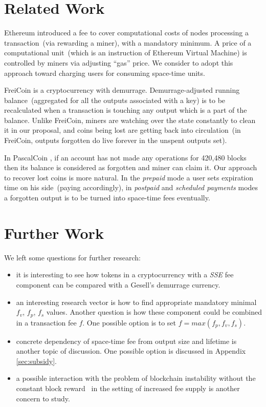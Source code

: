 \documentclass[]{llncs}   %
\newcommand{\esse}{\textit{SSE}}
\begin{document}
\section{Related Work}

Ethereum\cite{ethyp} introduced a fee to cover computational costs of nodes processing a transaction~(via rewarding a miner), with a mandatory minimum. A price of a computational unit~(which is an instruction of Ethereum Virtual Machine) is controlled by miners via adjusting ``gas'' price. We consider to adopt this approach toward charging users for consuming space-time units.

FreiCoin\cite{freicoin} is a cryptocurrency with demurrage. Demurrage-adjusted running balance~(aggregated for all the outputs associated with a key) is to be recalculated when a transaction is touching any output which is a part of the balance. Unlike FreiCoin, miners are watching over the state constantly to clean it in our proposal, and coins being lost are getting back into circulation~(in FreiCoin, outputs forgotten do live forever in the unspent outputs set).

In PascalCoin \cite{pascalCoin}, if an account has not made any operations for 420,480 blocks then its balance is considered as forgotten and miner can claim it. Our approach to recover lost coins is more natural. In the \textit{prepaid} mode a user sets expiration time on his side~(paying accordingly), in \textit{postpaid} and \textit{scheduled payments} modes a forgotten output is to be turned into space-time fees eventually.

\section{Further Work}

We left some questions for further research:

\begin{itemize}
  \item{}it is interesting to see how tokens in a cryptocurrency with a \esse{} fee component can be compared with a Gesell's demurrage currency\cite{gesell1958natural}.
  \item{}an interesting research vector is how to find appropriate mandatory minimal $f_v$, $f_p$, $f_s$ values. Another question is how these component could be combined in a transaction fee $f$. One possible option is to set $f = max(f_p, f_v, f_s)$.
  \item{}concrete dependency of space-time fee from output size and lifetime is another topic of discussion. One possible option is discussed in Appendix \ref{sec:subsidy}.
  \item{}a possible interaction with the problem of blockchain instability without the constant block reward~\cite{carlsten2016instability} in the setting of increased fee supply is another concern to study.
\end{itemize}
\end{document}

